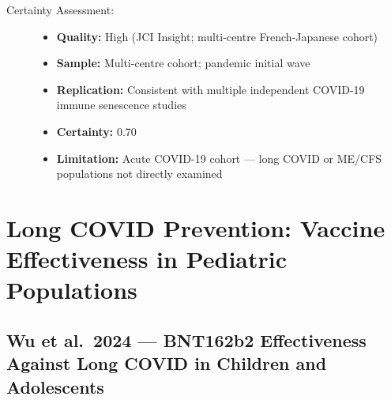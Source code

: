 \begin{description}
    \item[Certainty Assessment:]
    \begin{itemize}
        \item \textbf{Quality:} High (JCI Insight; multi-centre French-Japanese cohort)
        \item \textbf{Sample:} Multi-centre cohort; pandemic initial wave
        \item \textbf{Replication:} Consistent with multiple independent COVID-19 immune senescence studies
        \item \textbf{Certainty:} 0.70
        \item \textbf{Limitation:} Acute COVID-19 cohort --- long COVID or ME/CFS populations not directly examined
    \end{itemize}
\end{description}

\section{Long COVID Prevention: Vaccine Effectiveness in Pediatric Populations}
\label{sec:bib-longcovid-children-2026}

\subsection{Wu et al.\ 2024 --- BNT162b2 Effectiveness Against Long COVID in Children and Adolescents}

